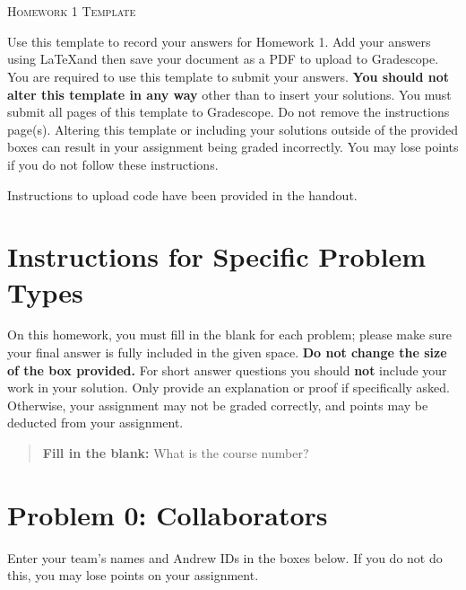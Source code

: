 \documentclass[12pt]{article}
\begin{document}
\section*{}
\begin{center}
  \centerline{\textsc{\LARGE  Homework 1 Template}}
\end{center}

Use this template to record your answers for Homework 1.  Add your answers using \LaTeX and then save your document as a PDF to upload to Gradescope.  You are required to use this template to submit your answers.  \textbf{You should not alter this template in any way} other than to insert your solutions.  You must submit all \pageref{LastPage} pages of this template to Gradescope.  Do not remove the instructions page(s).  Altering this template or including your solutions outside of the provided boxes can result in your assignment being graded incorrectly.  You may lose points if you do not follow these instructions.

Instructions to upload code have been provided in the handout.

\section*{Instructions for Specific Problem Types}

On this homework, you must fill in the blank for each problem; please make sure your final answer is fully included in the given space.  \textbf{Do not change the size of the box provided.}  For short answer questions you should \textbf{not} include your work in your solution.  Only provide an explanation or proof if specifically asked.  Otherwise, your assignment may not be graded correctly, and points may be deducted from your assignment.

\begin{quote}
\textbf{Fill in the blank:} What is the course number?

\begin{tcolorbox}[fit,height=1cm, width=4cm, blank, borderline={1pt}{-2pt},valign=center,nobeforeafter]
    \begin{center}\huge \end{center}
    \end{tcolorbox}
\end{quote}

\newpage

\section*{Problem 0: Collaborators}
Enter your team's names and Andrew IDs in the boxes below.  If you do not do this, you may lose points on your assignment.
\end{document}
